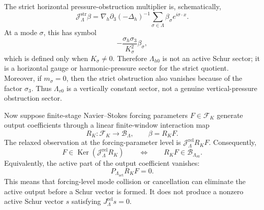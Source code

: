 \documentclass[11pt]{article}
\numberwithin{equation}{section}
\DeclareMathOperator{\Ker}{Ker}
\begin{document}
The strict horizontal pressure-obstruction multiplier is, schematically,
\[
        \mathcal J_\Lambda^{\mathrm{str}}\beta
        =\nabla_h\partial_3(-\Delta_h)^{-1}
        \sum_{\sigma\in\Lambda}\beta_\sigma e^{i\sigma\cdot x}.
\]
At a mode \(\sigma\), this has symbol
\[
        -\frac{\sigma_h\sigma_3}{K_\sigma^2}\beta_\sigma,
\]
which is defined only when \(K_\sigma\neq0\).  Therefore \(\Lambda_{h0}\) is not an active Schur sector; it is a horizontal gauge or harmonic-pressure sector for the strict quotient.  Moreover, if \(m_\sigma=0\), then the strict obstruction also vanishes because of the factor \(\sigma_3\).  Thus \(\Lambda_{v0}\) is a vertically constant sector, not a genuine vertical-pressure obstruction sector.

Now suppose finite-stage Navier--Stokes forcing parameters \(F\in\mathcal F_K\) generate output coefficients through a linear finite-window interaction map
\[
        R_K:\mathcal F_K\to\mathcal B_\Lambda,
        \qquad
        \beta=R_KF.
\]
The relaxed observation at the forcing-parameter level is \(\mathcal J_\Lambda^{\mathrm{rel}}R_KF\).  Consequently,
\[
        F\in\Ker(\mathcal J_\Lambda^{\mathrm{rel}}R_K)
        \qquad\Longleftrightarrow\qquad
        R_KF\in \mathcal B_{\Lambda_{v0}}.
\]
Equivalently, the active part of the output coefficient vanishes:
\[
        P_{\Lambda_{\mathrm{act}}}R_KF=0.
\]
This means that forcing-level mode collision or cancellation can eliminate the active output before a Schur vector is formed.  It does not produce a nonzero active Schur vector \(s\) satisfying \(J_\Lambda^{\mathrm{rel}}s=0\).
\end{document}
